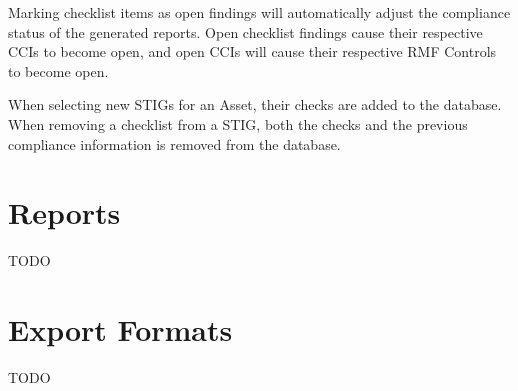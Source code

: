 \documentclass[letterpaper, 10pt, twoside]{article}
\begin{document}
Marking checklist items as open findings will automatically adjust the compliance status of the generated reports. Open checklist findings cause their respective CCIs to become open, and open CCIs will cause their respective RMF Controls to become open.

When selecting new STIGs for an Asset, their checks are added to the database. When removing a checklist from a STIG, both the checks and the previous compliance information is removed from the database.

\section{Reports}

TODO

\section{Export Formats}

TODO

\clearpage
\printbibliography
\end{document}
